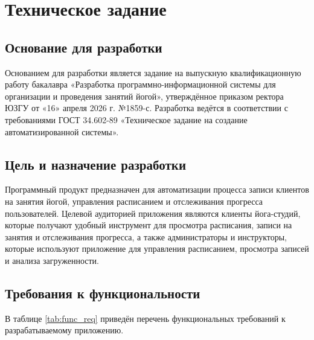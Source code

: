 \section{Техническое задание}

\subsection{Основание для разработки}

Основанием для разработки является задание на выпускную квалификационную работу бакалавра «Разработка программно-информационной системы для организации и проведения занятий йогой», утверждённое приказом ректора ЮЗГУ от «16» апреля 2026 г. №1859-с. Разработка ведётся в соответствии с требованиями ГОСТ 34.602-89 «Техническое задание на создание автоматизированной системы».

\subsection{Цель и назначение разработки}

Программный продукт предназначен для автоматизации процесса записи клиентов на занятия йогой, управления расписанием и отслеживания прогресса пользователей. Целевой аудиторией приложения являются клиенты йога-студий, которые получают удобный инструмент для просмотра расписания, записи на занятия и отслеживания прогресса, а также администраторы и инструкторы, которые используют приложение для управления расписанием, просмотра записей и анализа загруженности.

\subsection{Требования к функциональности}

В таблице \ref{tab:func_req} приведён перечень функциональных требований к разрабатываемому приложению.

